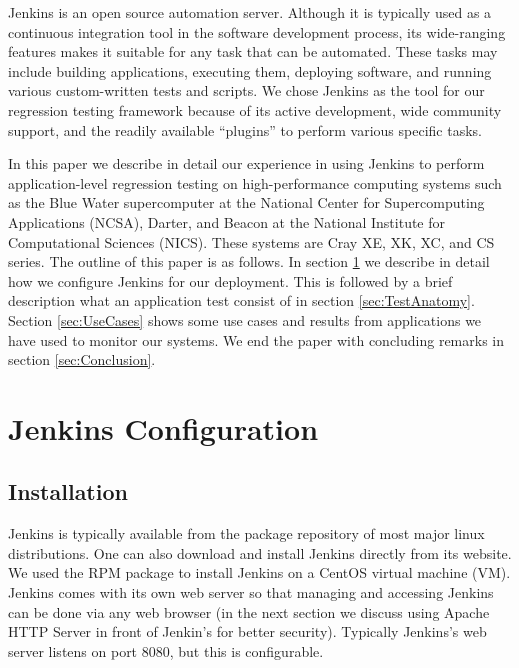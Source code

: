 \documentclass[10pt, conference, compsocconf]{IEEEtran}
\begin{document}
Jenkins is an open source automation server. 
Although it is typically used as a continuous integration tool in the software development process, its wide-ranging features makes it suitable for any task that can be automated. 
These tasks may include building applications, executing them, deploying software, and running various custom-written tests and scripts. 
We chose Jenkins as the tool for our regression testing framework because of its active development, wide community support, and the readily available ``plugins'' to perform various specific tasks.

In this paper we describe in detail our experience in using Jenkins to perform application-level regression testing on high-performance computing systems such as the Blue Water supercomputer at the National Center for Supercomputing Applications (NCSA), Darter, and Beacon at the National Institute for Computational Sciences (NICS). 
These systems are Cray XE, XK, XC, and CS series. 
The outline of this paper is as follows. In section \ref{sec:JenkinsConfiguration} we describe in detail how we configure Jenkins for our deployment. This is followed by a brief description what an application test consist of in section \ref{sec:TestAnatomy}. Section \ref{sec:UseCases} shows some use cases and results from applications we have used to monitor our systems. We end the paper with concluding remarks in section \ref{sec:Conclusion}.


\section{Jenkins Configuration}
\label{sec:JenkinsConfiguration}

\subsection{Installation}
Jenkins is typically available from the package repository of most major linux distributions. 
One can also download and install Jenkins directly from its website. 
We used the RPM package to install Jenkins on a CentOS virtual machine (VM). 
Jenkins comes with its own web server so that managing and accessing Jenkins can be done via any web browser (in the next section we discuss using Apache HTTP Server in front of Jenkin's for better security). 
Typically Jenkins's web server listens on port 8080, but this is configurable. 
\end{document}
